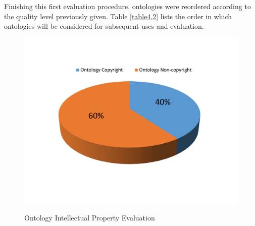 Finishing this first evaluation procedure, ontologies were reordered according to the quality level previously given. Table \ref{table4.2} lists the order in which ontologies will be considered for subsequent uses and evaluation. 



\begin{figure}
	\begin{center}
		\includegraphics[scale=0.4]{figure-chapterIV/fig4-4}\\
		\vspace{-20mm}
		\caption{Ontology Intellectual Property Evaluation}
		\label{figure4-4}
	\end{center}
\end{figure}






